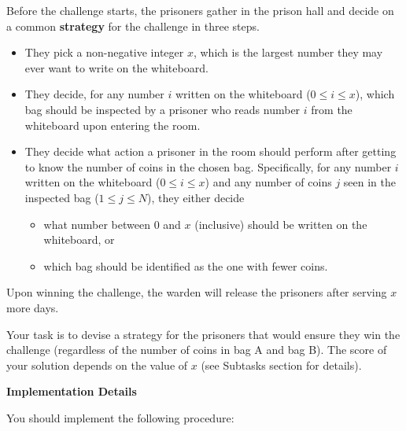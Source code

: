 Before the challenge starts, the prisoners gather in the prison hall and decide on a common \textbf{strategy} for the challenge in three steps.
\begin{itemize}
    \item They pick a non-negative integer $x$, which is the largest number they may ever want to write on the whiteboard.
\item They decide, for any number $i$ written on the whiteboard ($0 \le i \le x$), which bag should be inspected by a prisoner who reads number $i$ from the whiteboard upon entering the room.
\item They decide what action a prisoner in the room should perform after getting to know the number of coins in the chosen bag. Specifically, for any number $i$ written on the whiteboard ($0 \le i \le x$) and any number of coins $j$ seen in the inspected bag ($1 \le j \le N$), they either decide
\begin{itemize}
  \item what number between $0$ and $x$ (inclusive) should be written on the whiteboard, or
  \item which bag should be identified as the one with fewer coins.
  
\end{itemize}
\end{itemize}


Upon winning the challenge, the warden will release the prisoners after serving $x$ more days.

Your task is to devise a strategy for the prisoners that would ensure they win the challenge (regardless of the number of coins in bag A and bag B).
The score of your solution depends on the value of $x$ (see Subtasks section for details).


\textbf{Implementation Details}

You should implement the following procedure:

